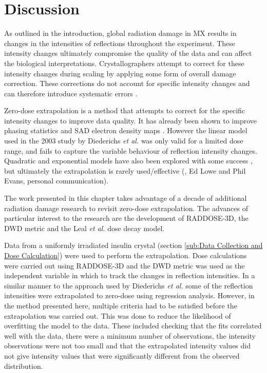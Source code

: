 \section{Discussion}
\label{sec:Discussion - Zero-dose extrapolation}
As outlined in the introduction, global radiation damage in MX results in changes in the intensities of reflections throughout the experiment.
These intensity changes ultimately compromise the quality of the data and can affect the biological interpretations.
Crystallographers attempt to correct for these intensity changes during scaling by applying some form of overall damage correction.
These corrections do not account for specific intensity changes and can therefore introduce systematic errors \cite{diederichs2003}.

Zero-dose extrapolation is a method that attempts to correct for the specific intensity changes to improve data quality.
It has already been shown to improve phasing statistics and SAD electron density maps \cite{diederichs2003}.
However the linear model used in the 2003 study by Diederichs \textit{et al.} was only valid for a limited dose range, and fails to capture the variable behaviour of reflection intensity changes.
Quadratic and exponential models have also been explored with some success \cite{diederichs2006}, but ultimately the extrapolation is rarely used/effective (\cite{borek2007many}, Ed Lowe and Phil Evans, personal communication).

The work presented in this chapter takes advantage of a decade of additional radiation damage research to revisit zero-dose extrapolation.
The advances of particular interest to the research are the development of RADDOSE-3D, the DWD metric and the Leal \textit{et al.}  dose decay model.

Data from a uniformly irradiated insulin crystal (section \ref{sub:Data Collection and Dose Calculation}) were used to perform the extrapolation.
Dose calculations were carried out using RADDOSE-3D and the DWD metric was used as the independent variable in which to track the changes in reflection intensities.
In a similar manner to the approach used by Diederichs \textit{et al.} some of the reflection intensities were extrapolated to zero-dose using regression analysis.
However, in the method presented here, multiple criteria had to be satisfied before the extrapolation was carried out.
This was done to reduce the likelihood of overfitting the model to the data.
These included checking that the fits correlated well with the data, there were a minimum number of observations, the intensity observations were not too small and that the extrapolated intensity values did not give intensity values that were significantly different from the observed distribution.


